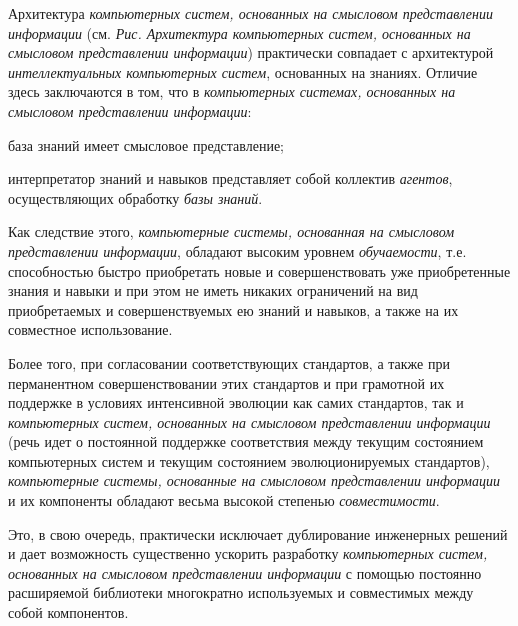 \begin{SCn}
\begin{scnsubstruct}
{			Архитектура \textit{компьютерных систем, основанных на
			смысловом представлении информации} (см. \textit{Рис. Архитектура компьютерных
			систем, основанных на смысловом представлении информации}) практически
			совпадает с архитектурой \textit{интеллектуальных компьютерных систем},
			основанных на знаниях. Отличие здесь заключаются в том, что в
			\textit{компьютерных системах, основанных на смысловом представлении
			информации}:
			\begin{scnitemize}
				\item база знаний имеет смысловое представление;
				\item интерпретатор знаний и навыков представляет собой коллектив
				\textit{агентов}, осуществляющих обработку \textit{базы знаний}.
			\end{scnitemize}
			Как следствие этого, \textit{компьютерные системы, основанная на
			смысловом представлении информации}, обладают высоким уровнем
			\textit{обучаемости}, т.е. способностью быстро приобретать новые и
			совершенствовать уже приобретенные знания и навыки и при этом не иметь никаких
			ограничений на вид приобретаемых и совершенствуемых ею знаний и навыков, а
			также на их совместное использование.
			
			Более того, при согласовании соответствующих стандартов, а также при перманентном совершенствовании этих
			стандартов и при грамотной их поддержке в условиях интенсивной эволюции как
			самих стандартов, так и \textit{компьютерных систем, основанных на смысловом
			представлении информации} (речь идет о постоянной поддержке соответствия между
			текущим состоянием компьютерных систем и текущим состоянием эволюционируемых
			стандартов), \textit{компьютерные системы, основанные на смысловом
			представлении информации} и их компоненты обладают весьма высокой степенью
			\textit{совместимости}.
			
			Это, в свою очередь, практически исключает дублирование
			инженерных решений и дает возможность существенно ускорить разработку
			\textit{компьютерных систем, основанных на смысловом представлении информации}
			с помощью постоянно расширяемой библиотеки многократно используемых и
			совместимых между собой компонентов. 
			
}
\end{scnsubstruct}
\end{SCn}
